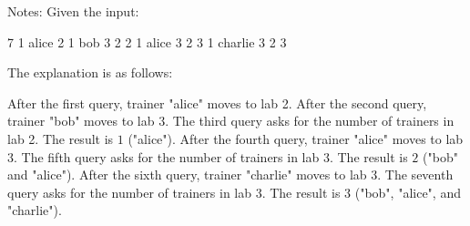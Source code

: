 Notes:
Given the input:

7  
1 alice 2  
1 bob 3  
2 2  
1 alice 3  
2 3  
1 charlie 3  
2 3  

The explanation is as follows:

    After the first query, trainer "alice" moves to lab 2.
    After the second query, trainer "bob" moves to lab 3.
    The third query asks for the number of trainers in lab 2. The result is $1$ ("alice").
    After the fourth query, trainer "alice" moves to lab 3.
    The fifth query asks for the number of trainers in lab 3. The result is $2$ ("bob" and "alice").
    After the sixth query, trainer "charlie" moves to lab 3.
    The seventh query asks for the number of trainers in lab 3. The result is $3$ ("bob", "alice", and "charlie").